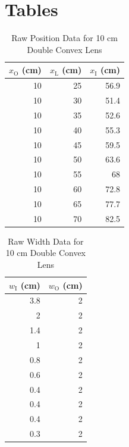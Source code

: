 \section{Tables}
%
\begin{table}[ht]
    \centering
    \begin{tabular}{|r|r|r|}
        \hline
        $x_{\text{O}}$ (cm) & $x_{\text{L}}$ (cm) & $x_{\text{I}}$ (cm) \\
        \hline
        10 & 25 & 56.9 \\
        10 & 30 & 51.4 \\
        10 & 35 & 52.6 \\
        10 & 40 & 55.3 \\
        10 & 45 & 59.5 \\
        10 & 50 & 63.6 \\
        10 & 55 & 68 \\
        10 & 60 & 72.8 \\
        10 & 65 & 77.7 \\
        10 & 70 & 82.5 \\
        \hline
        \end{tabular}
    \caption{Raw Position Data for 10 cm Double Convex Lens}
    \label{table.08.position.10cm}
\end{table}
%
\begin{table}[ht]
    \centering
    \begin{tabular}{|r|r|}
        \hline
        $w_{\text{I}}$ (cm) & $w_{\text{O}}$ (cm) \\
        \hline
        3.8 & 2 \\
        2 & 2 \\
        1.4 & 2 \\
        1 & 2 \\
        0.8 & 2 \\
        0.6 & 2 \\
        0.4 & 2 \\
        0.4 & 2 \\
        0.4 & 2 \\
        0.3 & 2 \\
        \hline
    \end{tabular}
    \caption{Raw Width Data for 10 cm Double Convex Lens}
    \label{table.08.width.10cm}
\end{table}
%
